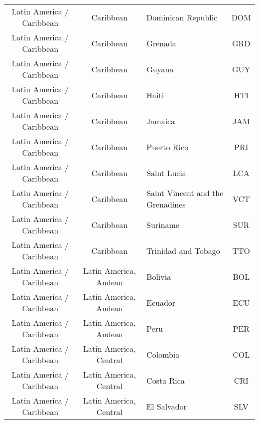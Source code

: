 \begin{landscape}
\begin{longtable}{|c|c|p{5cm}|c|}
     Latin America / Caribbean &                    Caribbean &                                Dominican Republic &  DOM \\
     Latin America / Caribbean &                    Caribbean &                                           Grenada &  GRD \\
     Latin America / Caribbean &                    Caribbean &                                            Guyana &  GUY \\
     Latin America / Caribbean &                    Caribbean &                                             Haiti &  HTI \\
     Latin America / Caribbean &                    Caribbean &                                           Jamaica &  JAM \\
     Latin America / Caribbean &                    Caribbean &                                       Puerto Rico &  PRI \\
     Latin America / Caribbean &                    Caribbean &                                       Saint Lucia &  LCA \\
     Latin America / Caribbean &                    Caribbean &        \raggedright Saint Vincent and the Grenadines &  VCT \\
     Latin America / Caribbean &                    Caribbean &                                          Suriname &  SUR \\
     Latin America / Caribbean &                    Caribbean &                               Trinidad and Tobago &  TTO \\
     Latin America / Caribbean &        Latin America, Andean &                                           Bolivia &  BOL \\
     Latin America / Caribbean &        Latin America, Andean &                                           Ecuador &  ECU \\
     Latin America / Caribbean &        Latin America, Andean &                                              Peru &  PER \\
     Latin America / Caribbean &       Latin America, Central &                                          Colombia &  COL \\
     Latin America / Caribbean &       Latin America, Central &                                        Costa Rica &  CRI \\
     Latin America / Caribbean &       Latin America, Central &                                       El Salvador &  SLV \\

\end{longtable}
\end{landscape}
